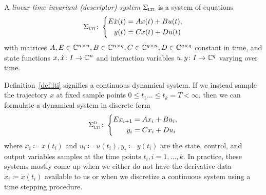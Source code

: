 \begin{definition}\label{def:lti}
    A \emph{linear time-invariant (descriptor) system} $\Sigma_{\textnormal{\scshape lti}}$ is a system of equations
    \begin{equation}\label{eq:lti}
        \Sigma_{\textnormal{\scshape lti}} \colon \left\lbrace
        \begin{aligned}
            E \dot{x}(t) &= A x(t) + B u(t), \\
            y(t) &= C x(t) + D u(t)
        \end{aligned}
        \right.
    \end{equation}
    with matrices $A, E \in \mathbb{C}^{n \times n}, B \in \mathbb{C}^{n \times q}, C \in \mathbb{C}^{q \times n}, D \in \mathbb{C}^{q \times q}$ constant in time, and state functions $x, \dot{x} \colon I \to \mathbb{C}^n$ and interaction variables $u, y \colon I \to \mathbb{C}^q$ varying over time.
\end{definition}

\begin{remark}
    Definition~\ref{def:lti} signifies a continuous dynamical system.
    If we instead sample the trajectory $x$ at fixed sample points $0 \leq t_1 \dots \leq t_k = T < \infty$, then we can formulate a dynamical system in discrete form
    \begin{equation*}
        \Sigma_{\textnormal{\scshape lti}}^{\textnormal{\scshape d}} \colon \left\lbrace
        \begin{aligned}
            E x_{i + 1} &= A x_i + B u_i, \\
            y_i &= C x_i + D u_i
        \end{aligned}
        \right.
    \end{equation*}
    where $x_i \coloneqq x(t_i)$ and $u_i \coloneqq u(t_i), y_i \coloneqq y(t_i)$ are the state, control, and output variables samples at the time points $t_i, i = 1, \dots, k$.
    In practice, these systems mostly come up when we either do not have the derivative data $\dot{x}_i \coloneqq \dot{x}(t_i)$ available to us or when we discretize a continuous system using a time stepping procedure.
\end{remark}

